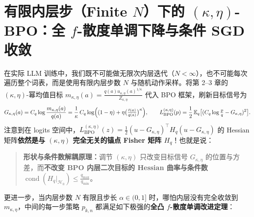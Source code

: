\documentclass[lang=cn,scheme=chinese,openany]{../book/elegantbook}
\newcommand{\E}{\mathbb E}
\begin{document}
\section{有限内层步（Finite \texorpdfstring{$N$}{N}）下的 \texorpdfstring{$(\kappa,\eta)$}{(kappa,eta)}-BPO：全 \texorpdfstring{$f$}{f}-散度单调下降与条件 SGD 收敛}
\label{sec:power-bpo-inner}

在实际 LLM 训练中，我们既不可能做无限次内层迭代（$N<\infty$），也不可能每次遍历整个词表，而是使用有限内层步数 $N$ 与随机动作采样。将第 2--3 章的 $(\kappa,\eta)$-幂均值目标 $m_{\kappa,\eta}(a)=\frac{q(a)u_{\kappa,\eta}(a)^{1/\kappa}}{Z_{\kappa,\eta}}$ 代入 BPO 框架，刷新目标信号为
\begin{equation}
 G_{\kappa,\eta}(a) = C_q\log\frac{m_{\kappa,\eta}(a)}{q(a)}
 = \frac{1}{\kappa}\,C_q\log\Bigl((1-\eta)+\eta\bigl(\tfrac{t(a)}{q(a)}\bigr)^\kappa\Bigr),
 \qquad
 L_{\mathrm{BPO}}^{(\kappa,\eta)}(p)=\frac12\,\E_q\bigl[(C_q\log\tfrac{p}{q}-G_{\kappa,\eta})^2\bigr].
 \label{eq:power-bpo-loss}
\end{equation}
注意到在 logits 空间中，$L_{\mathrm{BPO}}^{(\kappa,\eta)}(z)=\frac12(u-G_{\kappa,\eta})^\top H_q(u-G_{\kappa,\eta})$ 的 Hessian 矩阵\textbf{依然是与 $(\kappa,\eta)$ 完全无关的锚点 Fisher 矩阵 $H_q$}！也就是说：
\begin{quote}
\textbf{形状与条件数解耦原理：}调节 $(\kappa,\eta)$ 只改变目标信号 $G_{\kappa,\eta}$ 的位置与方差，而\textbf{不改变 BPO 内层二次目标的 Hessian 曲率与条件数} $\operatorname{cond}(H_q|_{\mathcal H_0})\le \frac{q_{\max}}{q_{\min}}$。
\end{quote}

更进一步，当内层步数 $N$ 有限且步长 $\alpha\in(0,1]$ 时，哪怕内层没有完全收敛到 $m_{\kappa,\eta}$，中间的每一步策略 $p_{k,n}$ 都满足如下极强的\textbf{全凸 $f$-散度单调改进定理}：
\end{document}
